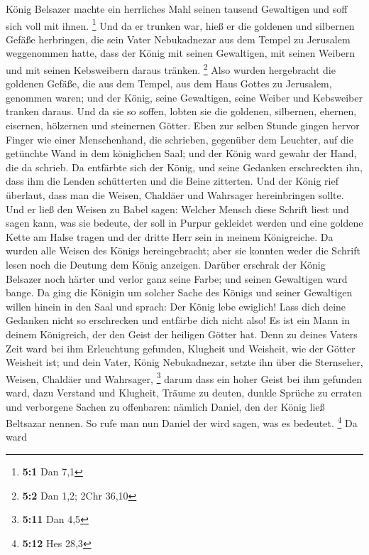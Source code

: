  König Belsazer machte ein herrliches Mahl seinen tausend
Gewaltigen und soff sich voll mit ihnen. \footnote{\textbf{5:1} Dan 7,1}
 Und da er trunken war, hieß er die goldenen und silbernen
Gefäße herbringen, die sein Vater Nebukadnezar aus dem Tempel zu
Jerusalem weggenommen hatte, dass der König mit seinen Gewaltigen, mit
seinen Weibern und mit seinen Kebsweibern daraus tränken. \footnote{\textbf{5:2}
  Dan 1,2; 2Chr 36,10}  Also wurden hergebracht die
goldenen Gefäße, die aus dem Tempel, aus dem Haus Gottes zu Jerusalem,
genommen waren; und der König, seine Gewaltigen, seine Weiber und
Kebsweiber tranken daraus.  Und da sie so soffen, lobten
sie die goldenen, silbernen, ehernen, eisernen, hölzernen und steinernen
Götter.  Eben zur selben Stunde gingen hervor Finger wie
einer Menschenhand, die schrieben, gegenüber dem Leuchter, auf die
getünchte Wand in dem königlichen Saal; und der König ward gewahr der
Hand, die da schrieb.  Da entfärbte sich der König, und
seine Gedanken erschreckten ihn, dass ihm die Lenden schütterten und die
Beine zitterten.  Und der König rief überlaut, dass man
die Weisen, Chaldäer und Wahrsager hereinbringen sollte. Und er ließ den
Weisen zu Babel sagen: Welcher Mensch diese Schrift liest und sagen
kann, was sie bedeute, der soll in Purpur gekleidet werden und eine
goldene Kette am Halse tragen und der dritte Herr sein in meinem
Königreiche.  Da wurden alle Weisen des Königs
hereingebracht; aber sie konnten weder die Schrift lesen noch die
Deutung dem König anzeigen.  Darüber erschrak der König
Belsazer noch härter und verlor ganz seine Farbe; und seinen Gewaltigen
ward bange.  Da ging die Königin um solcher Sache des
Königs und seiner Gewaltigen willen hinein in den Saal und sprach: Der
König lebe ewiglich! Lass dich deine Gedanken nicht so erschrecken und
entfärbe dich nicht also!  Es ist ein Mann in deinem
Königreich, der den Geist der heiligen Götter hat. Denn zu deines Vaters
Zeit ward bei ihm Erleuchtung gefunden, Klugheit und Weisheit, wie der
Götter Weisheit ist; und dein Vater, König Nebukadnezar, setzte ihn über
die Sternseher, Weisen, Chaldäer und Wahrsager, \footnote{\textbf{5:11}
  Dan 4,5}  darum dass ein hoher Geist bei ihm gefunden
ward, dazu Verstand und Klugheit, Träume zu deuten, dunkle Sprüche zu
erraten und verborgene Sachen zu offenbaren: nämlich Daniel, den der
König ließ Beltsazar nennen. So rufe man nun Daniel der wird sagen, was
es bedeutet. \footnote{\textbf{5:12} Hes 28,3}  Da ward
